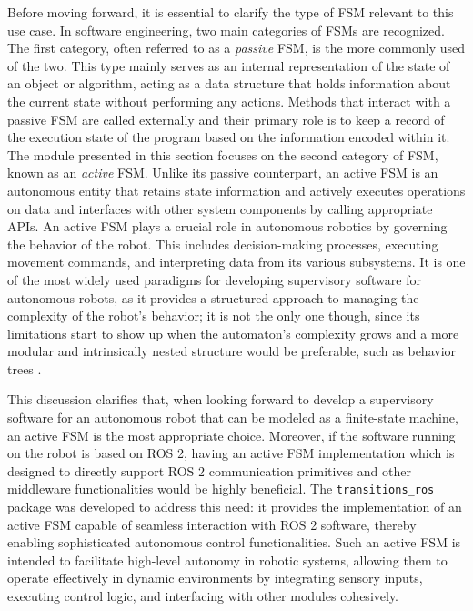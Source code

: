 Before moving forward, it is essential to clarify the type of FSM relevant to this use case. In software engineering, two main categories of FSMs are recognized. The first category, often referred to as a \emph{passive} FSM, is the more commonly used of the two. This type mainly serves as an internal representation of the state of an object or algorithm, acting as a data structure that holds information about the current state without performing any actions. Methods that interact with a passive FSM are called externally and their primary role is to keep a record of the execution state of the program based on the information encoded within it. The module presented in this section focuses on the second category of FSM, known as an \emph{active} FSM. Unlike its passive counterpart, an active FSM is an autonomous entity that retains state information and actively executes operations on data and interfaces with other system components by calling appropriate APIs. An active FSM plays a crucial role in autonomous robotics by governing the behavior of the robot. This includes decision-making processes, executing movement commands, and interpreting data from its various subsystems. It is one of the most widely used paradigms for developing supervisory software for autonomous robots, as it provides a structured approach to managing the complexity of the robot's behavior; it is not the only one though, since its limitations start to show up when the automaton's complexity grows and a more modular and intrinsically nested structure would be preferable, such as behavior trees \cite{iovino_survey_2022}.

This discussion clarifies that, when looking forward to develop a supervisory software for an autonomous robot that can be modeled as a finite-state machine, an active FSM is the most appropriate choice. Moreover, if the software running on the robot is based on ROS 2, having an active FSM implementation which is designed to directly support ROS 2 communication primitives and other middleware functionalities would be highly beneficial. The \texttt{transitions\_ros} package \cite{masocco_transitions_ros_2022} was developed to address this need: it provides the implementation of an active FSM capable of seamless interaction with ROS 2 software, thereby enabling sophisticated autonomous control functionalities. Such an active FSM is intended to facilitate high-level autonomy in robotic systems, allowing them to operate effectively in dynamic environments by integrating sensory inputs, executing control logic, and interfacing with other modules cohesively.

